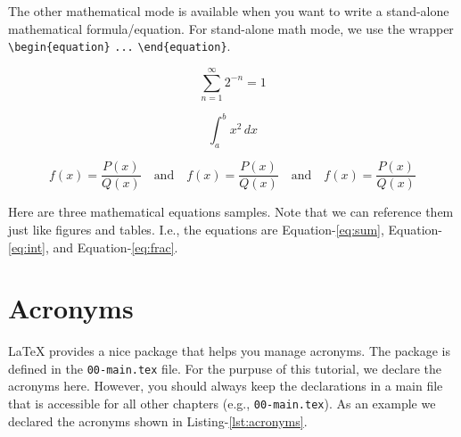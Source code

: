 The other mathematical mode is available when you want to write a stand-alone mathematical formula/equation. For stand-alone math mode, we use the wrapper \verb|\begin{equation}| \verb|...| \verb|\end{equation}|.

\begin{equation}
    \sum_{n=1}^{\infty} 2^{-n} = 1
    \label{eq:sum}
\end{equation}

\begin{equation}
    \int_{a}^{b} x^2 \,dx
    \label{eq:int}
\end{equation}

\begin{equation}
    f(x)=\frac{P(x)}{Q(x)}\quad \textrm{and}\quad \textstyle f(x)=\frac{P(x)}{Q(x)}\quad \textrm{and}\quad \scriptstyle f(x)=\frac{P(x)}{Q(x)}
    \label{eq:frac}
\end{equation}

Here are three mathematical equations samples. Note that we can reference them just like figures and tables. I.e., the equations are Equation-\ref{eq:sum}, Equation-\ref{eq:int}, and Equation-\ref{eq:frac}. 

\section{Acronyms}
\label{sec:acronyms}


{\LaTeX} provides a nice package that helps you manage acronyms. The package is defined in the \texttt{00-main.tex} file. For the purpuse of this tutorial, we declare the acronyms here. However, you should always keep the declarations in a main file that is accessible for all other chapters (e.g., \texttt{00-main.tex}). As an example we declared the acronyms shown in Listing-\ref{lst:acronyms}. 

